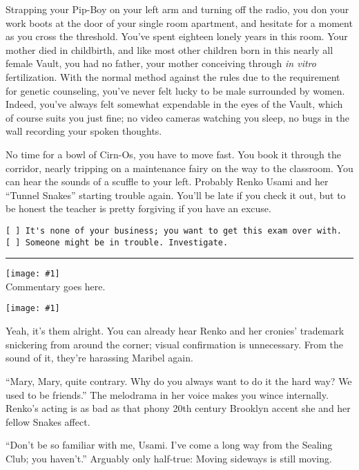 \documentclass[a4paper,12pt]{book}
\newenvironment{commentary}%
	{
		\vfill%
		\hrule%
		\begin{footnotesize}%
		\color{MidnightBlue}%
	}%
	{%
		\end{footnotesize}%
	}
\newcommand{\img}[1]{%
	\texttt{[image: \#1]}%
}
\begin{document}
Strapping your Pip-Boy on your left arm and turning off the radio, you don your work boots at the door of your single room apartment, and hesitate for a moment as you cross the threshold. You've spent eighteen lonely years in this room. Your mother died in childbirth, and like most other children born in this nearly all female Vault, you had no father, your mother conceiving through \emph{in vitro} fertilization. With the normal method against the rules due to the requirement for genetic counseling, you've never felt lucky to be male surrounded by women. Indeed, you've always felt somewhat expendable in the eyes of the Vault, which of course suits you just fine; no video cameras watching you sleep, no bugs in the wall recording your spoken thoughts.

No time for a bowl of Cirn-Os, you have to move fast. You book it through the corridor, nearly tripping on a maintenance fairy on the way to the classroom. You can hear the sounds of a scuffle to your left. Probably Renko Usami and her ``Tunnel Snakes'' starting trouble again. You'll be late if you check it out, but to be honest the teacher is pretty forgiving if you have an excuse.

\begin{verbatim}
[ ] It's none of your business; you want to get this exam over with.
[ ] Someone might be in trouble. Investigate.
\end{verbatim}


\begin{commentary}
\img{frosted-cirnos}\\
Commentary goes here.
\end{commentary}



\newpage

\img{renko-mary}

Yeah, it's them alright. You can already hear Renko and her cronies' trademark snickering from around the corner; visual confirmation is unnecessary. From the sound of it, they're harassing Maribel again.

``Mary, Mary, quite contrary. Why do you always want to do it the hard way? We used to be friends.'' The melodrama in her voice makes you wince internally. Renko's acting is as bad as that phony 20th century Brooklyn accent she and her fellow Snakes affect.

``Don't be so familiar with me, Usami. I've come a long way from the Sealing Club; you haven't.'' Arguably only half-true: Moving sideways is still moving.
\end{document}
